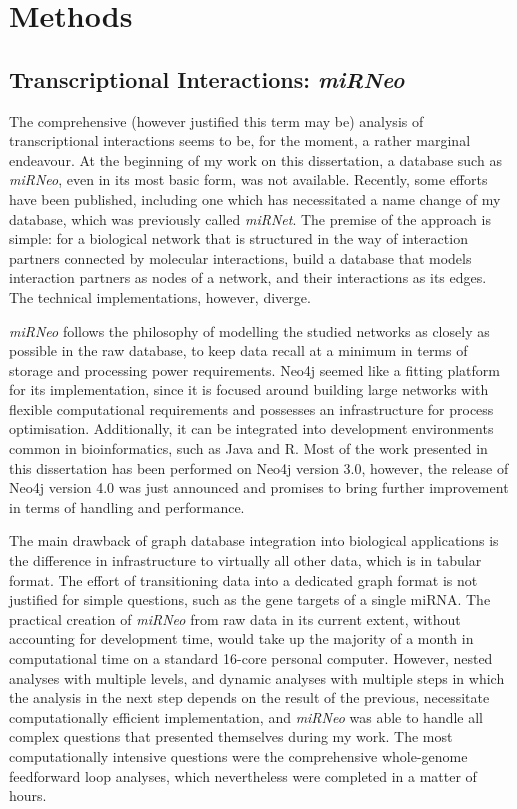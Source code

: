 \section{Methods} \label{sec:discussion:methods}

\subsection{Transcriptional Interactions: \emph{miRNeo}} \label{sec:discussion:mirneo}
The comprehensive (however justified this term may be) analysis of transcriptional interactions seems to be, for the moment, a rather marginal endeavour. At the beginning of my work on this dissertation, a database such as \emph{miRNeo}, even in its most basic form, was not available. Recently, some efforts have been published,\cite{Fan2016,Tokar2018} including one which has necessitated a name change of my database, which was previously called \emph{miRNet}.\cite{Lobentanzer2019a,Fan2016} The premise of the approach is simple: for a biological network that is structured in the way of interaction partners connected by molecular interactions, build a database that models interaction partners as nodes of a network, and their interactions as its edges. The technical implementations, however, diverge.

\emph{miRNeo} follows the philosophy of modelling the studied networks as closely as possible in the raw database, to keep data recall at a minimum in terms of storage and processing power requirements. Neo4j seemed like a fitting platform for its implementation, since it is focused around building large networks with flexible computational requirements and possesses an infrastructure for process optimisation. Additionally, it can be integrated into development environments common in bioinformatics, such as Java and R. Most of the work presented in this dissertation has been performed on Neo4j version 3.0, however, the release of Neo4j version 4.0 was just announced and promises to bring further improvement in terms of handling and performance.\cite{Neo4j2020}

The main drawback of graph database integration into biological applications is the difference in infrastructure to virtually all other data, which is in tabular format. The effort of transitioning data into a dedicated graph format is not justified for simple questions, such as the gene targets of a single miRNA. The practical creation of \emph{miRNeo} from raw data in its current extent, without accounting for development time, would take up the majority of a month in computational time on a standard 16-core personal computer. However, nested analyses with multiple levels, and dynamic analyses with multiple steps in which the analysis in the next step depends on the result of the previous, necessitate computationally efficient implementation, and \emph{miRNeo} was able to handle all complex questions that presented themselves during my work. The most computationally intensive questions were the comprehensive whole-genome feedforward loop analyses, which nevertheless were completed in a matter of hours.

